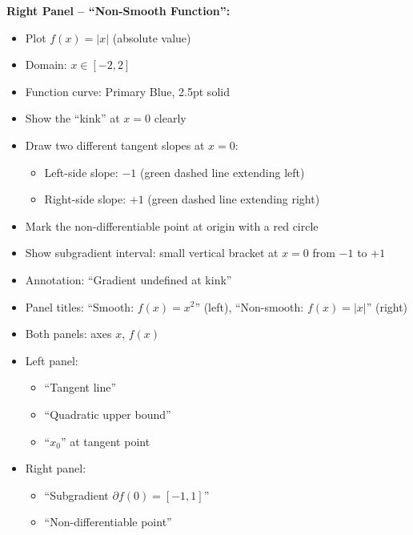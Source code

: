 \documentclass[12pt]{article}
\begin{document}
\begin{description}[style=nextline, leftmargin=0pt]
    \textbf{Right Panel -- ``Non-Smooth Function'':}
    \begin{itemize}
        \item Plot $f(x) = |x|$ (absolute value)
        \item Domain: $x \in [-2, 2]$
        \item Function curve: Primary Blue, 2.5pt solid
        \item Show the ``kink'' at $x = 0$ clearly
        \item Draw two different tangent slopes at $x = 0$:
        \begin{itemize}
            \item Left-side slope: $-1$ (green dashed line extending left)
            \item Right-side slope: $+1$ (green dashed line extending right)
        \end{itemize}
        \item Mark the non-differentiable point at origin with a red circle
        \item Show subgradient interval: small vertical bracket at $x=0$ from $-1$ to $+1$
        \item Annotation: ``Gradient undefined at kink''
    \end{itemize}

    \item[Required Labels]
    \begin{itemize}
        \item Panel titles: ``Smooth: $f(x) = x^2$'' (left), ``Non-smooth: $f(x) = |x|$'' (right)
        \item Both panels: axes $x$, $f(x)$
        \item Left panel:
        \begin{itemize}
            \item ``Tangent line''
            \item ``Quadratic upper bound''
            \item ``$x_0$'' at tangent point
        \end{itemize}
        \item Right panel:
        \begin{itemize}
            \item ``Subgradient $\partial f(0) = [-1, 1]$''
            \item ``Non-differentiable point''
        \end{itemize}
    \end{itemize}


\end{description}
\end{document}
